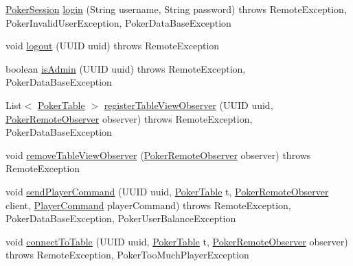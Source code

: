 \begin{DoxyCompactItemize}
\hyperlink{classhu_1_1elte_1_1bfw1p6_1_1poker_1_1model_1_1_poker_session}{Poker\+Session} \hyperlink{interfacehu_1_1elte_1_1bfw1p6_1_1poker_1_1rmi_1_1_poker_remote_a88cf2a75a0ab7176af18b1463b851675}{login} (String username, String password)  throws Remote\+Exception, Poker\+Invalid\+User\+Exception, Poker\+Data\+Base\+Exception
\item 
void \hyperlink{interfacehu_1_1elte_1_1bfw1p6_1_1poker_1_1rmi_1_1_poker_remote_a5621c1ef70279dfdda38bc61012fff37}{logout} (U\+U\+I\+D uuid)  throws Remote\+Exception
\item 
boolean \hyperlink{interfacehu_1_1elte_1_1bfw1p6_1_1poker_1_1rmi_1_1_poker_remote_adb40be97e42f1fa63599b51f20865e8a}{is\+Admin} (U\+U\+I\+D uuid)  throws Remote\+Exception, Poker\+Data\+Base\+Exception
\item 
List$<$ \hyperlink{classhu_1_1elte_1_1bfw1p6_1_1poker_1_1model_1_1entity_1_1_poker_table}{Poker\+Table} $>$ \hyperlink{interfacehu_1_1elte_1_1bfw1p6_1_1poker_1_1rmi_1_1_poker_remote_a9a1a358456798ca4cf8ce37f29a6cbc9}{register\+Table\+View\+Observer} (U\+U\+I\+D uuid, \hyperlink{interfacehu_1_1elte_1_1bfw1p6_1_1poker_1_1client_1_1observer_1_1_poker_remote_observer}{Poker\+Remote\+Observer} observer)  throws Remote\+Exception, Poker\+Data\+Base\+Exception
\item 
void \hyperlink{interfacehu_1_1elte_1_1bfw1p6_1_1poker_1_1rmi_1_1_poker_remote_a2f1bbf9e1c19711ef34d76fbcee605d3}{remove\+Table\+View\+Observer} (\hyperlink{interfacehu_1_1elte_1_1bfw1p6_1_1poker_1_1client_1_1observer_1_1_poker_remote_observer}{Poker\+Remote\+Observer} observer)  throws Remote\+Exception
\item 
void \hyperlink{interfacehu_1_1elte_1_1bfw1p6_1_1poker_1_1rmi_1_1_poker_remote_a95de0987012df23d93d886482d3f5528}{send\+Player\+Command} (U\+U\+I\+D uuid, \hyperlink{classhu_1_1elte_1_1bfw1p6_1_1poker_1_1model_1_1entity_1_1_poker_table}{Poker\+Table} t, \hyperlink{interfacehu_1_1elte_1_1bfw1p6_1_1poker_1_1client_1_1observer_1_1_poker_remote_observer}{Poker\+Remote\+Observer} client, \hyperlink{classhu_1_1elte_1_1bfw1p6_1_1poker_1_1command_1_1_player_command}{Player\+Command} player\+Command)  throws Remote\+Exception, Poker\+Data\+Base\+Exception, Poker\+User\+Balance\+Exception
\item 
void \hyperlink{interfacehu_1_1elte_1_1bfw1p6_1_1poker_1_1rmi_1_1_poker_remote_a07816baa4c23140d5d4e580726254597}{connect\+To\+Table} (U\+U\+I\+D uuid, \hyperlink{classhu_1_1elte_1_1bfw1p6_1_1poker_1_1model_1_1entity_1_1_poker_table}{Poker\+Table} t, \hyperlink{interfacehu_1_1elte_1_1bfw1p6_1_1poker_1_1client_1_1observer_1_1_poker_remote_observer}{Poker\+Remote\+Observer} observer)  throws Remote\+Exception, Poker\+Too\+Much\+Player\+Exception

\end{DoxyCompactItemize}
